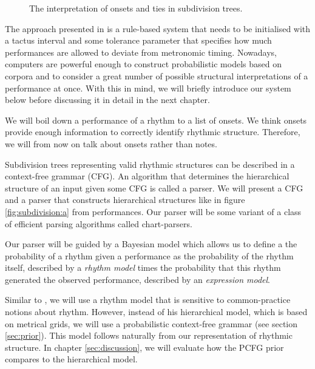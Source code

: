 \begin{figure}
\centering
{}

\caption{The interpretation of onsets and ties in subdivision trees.}
\label{fig:ties}
\end{figure}

The approach presented in \citet{longuet1976perception} is a rule-based system that needs to be initialised with a tactus interval and some tolerance parameter that specifies how much performances are allowed to deviate from metronomic timing. Nowadays, computers are powerful enough to construct probabilistic models based on corpora and to consider a great number of possible structural interpretations of a performance at once. With this in mind, we will briefly introduce our system below before discussing it in detail in the next chapter.

We will boil down a performance of a rhythm to a list of onsets. We think onsets provide enough information to correctly identify rhythmic structure. Therefore, we will from now on talk about onsets rather than notes.

Subdivision trees representing valid rhythmic structures can be described in a context-free grammar (CFG). An algorithm that determines the hierarchical structure of an input given some CFG is called a parser. We will present a CFG and a parser that constructs hierarchical structures like in figure \ref{fig:subdivision:a} from performances. Our parser will be some variant of a class of efficient parsing algorithms called chart-parsers.

Our parser will be guided by a Bayesian model which allows us to define a the probability of a rhythm given a performance as the probability of the rhythm itself, described by a \textit{rhythm model} times the probability that this rhythm generated the observed performance, described by an \textit{expression model}.

Similar to \cite{temperley2009unified}, we will use a rhythm model that is sensitive to common-practice notions about rhythm. However, instead of his hierarchical model, which is based on metrical grids, we will use a probabilistic context-free grammar (see section \ref{sec:prior}). This model follows naturally from our representation of rhythmic structure. In chapter \ref{sec:discussion}, we will evaluate how the PCFG prior compares to the hierarchical model.

